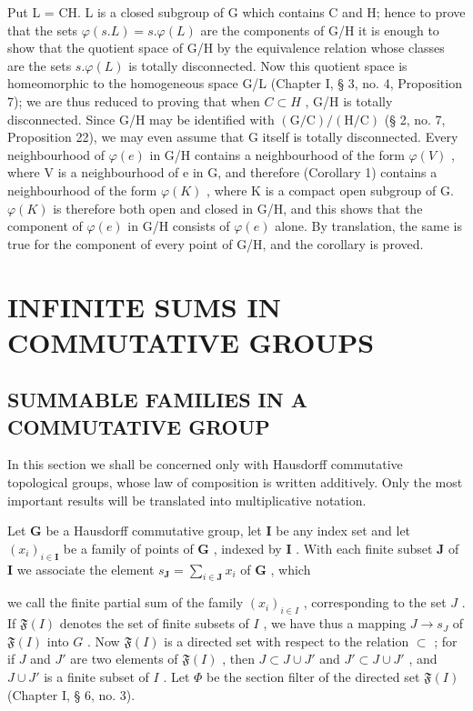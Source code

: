 Put L = CH. L is a closed subgroup of G which contains C and H; hence to prove that the sets \(\varphi(s.L) = s.\varphi(L)\) are the components of G/H it is enough to show that the quotient space of G/H by the equivalence relation whose classes are the sets \(s.\varphi(L)\) is totally disconnected. Now this quotient space is homeomorphic to the homogeneous space G/L (Chapter I, § 3, no. 4, Proposition 7); we are thus reduced to proving that when \(C \subset H\) , G/H is totally disconnected. Since G/H may be identified with \((\mathrm{G/C})/(\mathrm{H/C})\) (§ 2, no. 7, Proposition 22), we may even assume that G itself is totally disconnected. Every neighbourhood of \(\varphi(e)\) in G/H contains a neighbourhood of the form \(\varphi(V)\) , where V is a neighbourhood of e in G, and therefore (Corollary 1) contains a neighbourhood of the form \(\varphi(K)\) , where K is a compact open subgroup of G. \(\varphi(K)\) is therefore both open and closed in G/H, and this shows that the component of \(\varphi(e)\) in G/H consists of \(\varphi(e)\) alone. By translation, the same is true for the component of every point of G/H, and the corollary is proved.

\section{INFINITE SUMS IN COMMUTATIVE GROUPS}

\subsection{SUMMABLE FAMILIES IN A COMMUTATIVE GROUP}

In this section we shall be concerned only with Hausdorff commutative topological groups, whose law of composition is written additively. Only the most important results will be translated into multiplicative notation.

Let \(\mathbf{G}\) be a Hausdorff commutative group, let \(\mathbf{I}\) be any index set and let \((x_{i})_{i\in \mathbf{I}}\) be a family of points of \(\mathbf{G}\) , indexed by \(\mathbf{I}\) . With each finite subset \(\mathbf{J}\) of \(\mathbf{I}\) we associate the element \(s_{\mathbf{J}} = \sum_{i\in \mathbf{J}}x_i\) of \(\mathbf{G}\) , which

we call the finite partial sum of the family \((x_{i})_{i\in I}\) , corresponding to the set \(J\) . If \(\mathfrak{F}(I)\) denotes the set of finite subsets of \(I\) , we have thus a mapping \(J\to s_J\) of \(\mathfrak{F}(I)\) into \(G\) . Now \(\mathfrak{F}(I)\) is a directed set with respect to the relation \(\subset\) ; for if \(J\) and \(J'\) are two elements of \(\mathfrak{F}(I)\) , then \(J\subset J\cup J'\) and \(J'\subset J\cup J'\) , and \(J\cup J'\) is a finite subset of \(I\) . Let \(\Phi\) be the section filter of the directed set \(\mathfrak{F}(I)\) (Chapter I, § 6, no. 3).

